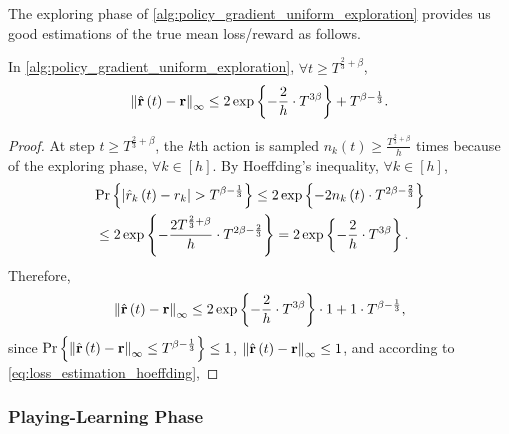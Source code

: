 The exploring phase of \cref{alg:policy_gradient_uniform_exploration} provides us good estimations of the true mean loss/reward as follows.
\begin{thm}
\label{thm:loss_estimation_hoeffding}
    In \cref{alg:policy_gradient_uniform_exploration}, $\forall t \ge T^{\frac{2}{3} + \beta}$,
\begin{equation*}
    \left\| \hat{{\mathbf{r}}}\left(t\right) - {\mathbf{r}} \right\|_\infty \le 2 \exp\left\{ - \frac{2}{h} \cdot  T^{3\beta} \right\} + T^{\beta - \frac{1}{3}}.
\end{equation*}
\end{thm}
\begin{proof}
    At step $t \ge T^{\frac{2}{3} + \beta}$, the $k$th action is sampled $n_{k}\left(t\right) \ge \frac{T^{\frac{2}{3} + \beta} }{h}$ times because of the exploring phase, $\forall k \in [h]$. By Hoeffding's inequality, $\forall k \in [h]$,
\begin{equation}
\label{eq:loss_estimation_hoeffding}
\begin{split}
    &{\text{Pr}}\left\{ \left| \hat{r}_{ k}\left(t\right) - r_{k} \right| > T^{\beta - \frac{1}{3}} \right\} \le 2 \exp\left\{ - 2 n_{ k}\left(t\right) \cdot T^{2\beta - \frac{2}{3}} \right\} \\
    &\le 2 \exp\left\{ -  \frac{2 T^{\frac{2}{3} + \beta}}{h} \cdot T^{2\beta - \frac{2}{3}} \right\} = 2 \exp\left\{ - \frac{2}{h} \cdot  T^{3\beta} \right\}.
\end{split}
\end{equation}
Therefore,
\begin{equation*}
\begin{split}
    \left\| \hat{{\mathbf{r}}}\left(t\right) - {\mathbf{r}} \right\|_\infty \le 2 \exp\left\{ - \frac{2}{h} \cdot  T^{3\beta} \right\} \cdot 1 + 1 \cdot T^{\beta - \frac{1}{3}},
\end{split}
\end{equation*}
since ${\text{Pr}}\left\{ \left\| \hat{{\mathbf{r}}}\left(t\right) - {\mathbf{r}} \right\|_\infty \le T^{\beta - \frac{1}{3}} \right\} \le 1$, $\left\| \hat{{\mathbf{r}}}\left(t\right) - {\mathbf{r}} \right\|_\infty \le 1$, and according to \cref{eq:loss_estimation_hoeffding}, 
\end{proof}

\subsubsection{Playing-Learning Phase}
\label{subsubsec:playing_learning_phase}

